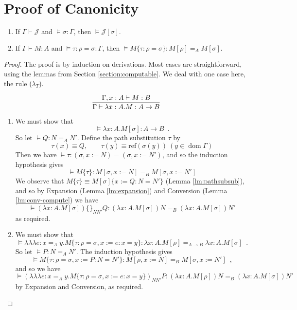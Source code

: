 \documentclass[a4paper,UKenglish]{lipics-v2016}
\newcommand*{\reff}[1]{\ensuremath{\mathrm{ref} \left( {#1} \right)}}
\newcommand*{\triplelambda}{\ensuremath{\lambda \!\! \lambda \!\! \lambda}}
\newcommand*{\dom}{\ensuremath{\operatorname{dom}}}
\theoremstyle{plain}
\theoremstyle{definition}
\begin{document}
\section{Proof of Canonicity}

\begin{theorem}
\begin{enumerate}
\item
If $\Gamma \vdash \mathcal{J}$ and $\models \sigma : \Gamma$, then $\models \mathcal{J} [ \sigma ]$.
\item
If $\Gamma \vdash M : A$ and $\models \tau : \rho = \sigma : \Gamma$, then $\models M \{ \tau : \rho = \sigma \} : M [ \rho ] =_A M [ \sigma ]$.
\end{enumerate}
\end{theorem}

\begin{proof}
The proof is by induction on derivations.  Most cases are straightforward, using the lemmas from
Section \ref{section:computable}.  We deal with one case here, the rule ($\lambda_T$).

$$ \infer{\Gamma \vdash \lambda x:A.M : A \rightarrow B}{\Gamma, x : A \vdash M : B} $$

\begin{enumerate}
\item
We must show that
$$ \models \lambda x:A.M[\sigma] : A \rightarrow B \enspace . $$
So let $\models Q : N =_A N'$.  Define the path substitution $\tau$ by
$$ \tau(x) \equiv Q, \qquad \tau(y) \equiv \reff{\sigma(y)} \ (y \in \dom \Gamma) $$
Then we have $\models \tau : (\sigma, x:=N) = (\sigma, x:=N')$, and so the induction hypothesis gives
$$ \models M \{ \tau \} : M[\sigma, x:=N] =_B M [ \sigma, x:= N' ] $$
We observe that $M \{ \tau \} \equiv M [ \sigma ] \{ x:=Q:N=N' \}$ (Lemma \ref{lm:pathsubsub}),
and so by Expansion (Lemma \ref{lm:expansion}) and Conversion (Lemma \ref{lm:conv-compute}) we have
$$ \models (\lambda x:A.M[\sigma])\{\}_{N N'} Q : (\lambda x:A.M[\sigma])N =_B (\lambda x:A.M[\sigma])N' $$
as required.
\item
We must show that
$$  \models \triplelambda e : x =_A y. M \{ \tau : \rho = \sigma, x := e : x = y \} : \lambda x:A.M [ \rho ] =_{A \rightarrow B} \lambda x:A.M [ \sigma ] \enspace . $$
So let $ \models P : N =_A N'$.  The induction hypothesis gives
$$  \models M \{ \tau : \rho = \sigma, x := P : N = N' \} : M [\rho, x := N] =_B M [\sigma, x := N'] \enspace , $$
and so we have
$$  \models (\triplelambda e : x =_A y. M \{ \tau : \rho = \sigma, x := e : x = y \})_{N N'} P : (\lambda x:A.M [ \rho ])N =_B (\lambda x:A.M [ \sigma ])N'$$
by Expansion and Conversion, as required.
\end{enumerate}
\end{proof}
\end{document}
